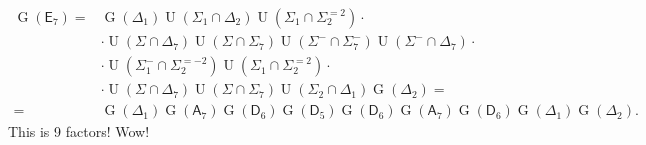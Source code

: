 \documentclass[oneside, 12pt]{amsart}
\theoremstyle{plain}
\numberwithin{equation}{section}
\numberwithin{lemma}{section}
\theoremstyle{definition}
\theoremstyle{remark}
\DeclareMathOperator{\G}{G}
\DeclareMathOperator{\U}{U}
\newcommand{\rA}{\mathsf{A}}
\newcommand{\rD}{\mathsf{D}}
\newcommand{\rE}{\mathsf{E}}
\begin{document}
\begin{align*}
\G(\rE_7) ={} & \G(\Delta_1) \U(\Sigma_1\cap\Delta_2) \U(\Sigma_1\cap\Sigma_2^{=2}) \cdot{} \\
& \cdot \U(\Sigma\cap\Delta_7) \U(\Sigma\cap\Sigma_7) \U(\Sigma^-\cap\Sigma_7^-) \U(\Sigma^-\cap\Delta_7) \cdot{} \\
& \cdot \U(\Sigma_1^-\cap\Sigma_2^{=-2}) \U(\Sigma_1\cap\Sigma_2^{=2}) \cdot{} \\
& \cdot \U(\Sigma\cap\Delta_7) \U(\Sigma\cap\Sigma_7) \U(\Sigma_2\cap\Delta_1) \G(\Delta_2) = \\
={} & \G(\Delta_1) \G(\rA_7) \G(\rD_6) \G(\rD_5) \G(\rD_6) \G(\rA_7) \G(\rD_6) \G(\Delta_1) \G(\Delta_2).
\end{align*}
This is 9 factors! Wow!
\printbibliography
\end{document}
